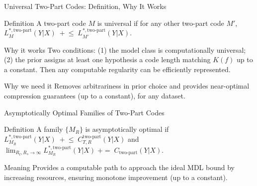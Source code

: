 \documentclass{beamer}
\begin{document}
\begin{frame}{Universal Two-Part Codes: Definition, Why It Works}
\small
\begin{block}{Definition}
A two-part code $M$ is universal if for any other two-part code $M'$, $L^{\ast,\text{two-part}}_M(Y|X) \;{+}\!\le\; L^{\ast,\text{two-part}}_{M'}(Y|X)$.
\end{block}

\begin{block}{Why it works}
Two conditions: (1) the model class is computationally universal; (2) the prior assigns at least one hypothesis a code length matching $K(f)$ up to a constant. Then any computable regularity can be efficiently represented.
\end{block}

\begin{block}{Why we need it}
Removes arbitrariness in prior choice and provides near-optimal compression guarantees (up to a constant), for any dataset.
\end{block}
\end{frame}

\begin{frame}{Asymptotically Optimal Families of Two-Part Codes}
\small
\begin{block}{Definition}
A family $\{M_R\}$ is asymptotically optimal if $L^{\ast,\text{two-part}}_{M_R}(Y|X)\; {+}\!\le\; C^{\text{two-part}}_{T,R}(Y|X)$ and $\lim_{R_t,R_s\to\infty} L^{\ast,\text{two-part}}_{M_R}(Y|X)\;{+=}\;C_{\text{two-part}}(Y|X)$.
\end{block}

\begin{block}{Meaning}
Provides a computable path to approach the ideal MDL bound by increasing resources, ensuring monotone improvement (up to a constant).
\end{block}
\end{frame}
\end{document}
